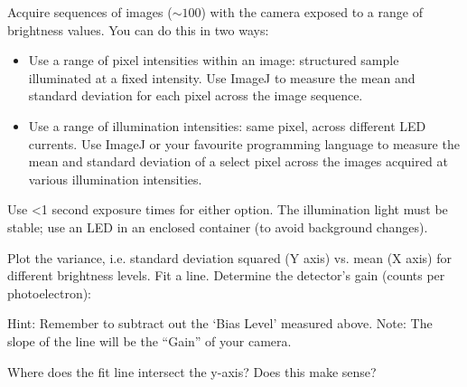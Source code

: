 \documentclass[a4paper]{report}
\newcommand{\nexercise}[0]{\arabic{exercises}\addtocounter{exercises}{1}}
\begin{document}
\begin{exercisebox}[frametitle={Exercise \nexercise: Measure shot noise}]
Acquire sequences of images ($\sim 100$) with the camera exposed to a range of brightness values. You can do this in two ways:
\begin{itemize}
	\item Use a range of pixel intensities within an image: structured sample illuminated at a fixed intensity. Use ImageJ to measure the mean and standard deviation for each pixel across the image sequence.
	\item Use a range of illumination intensities: same pixel, across different LED currents. Use ImageJ or your favourite programming language to measure the mean and standard deviation of a select pixel across the images acquired at various illumination intensities.
\end{itemize}
Use <1 second exposure times for either option. The illumination light must be stable; use an LED in an enclosed container (to avoid background changes). 

Plot the variance, i.e. standard deviation squared (Y axis) vs. mean (X axis) for different brightness levels. Fit a line. 
Determine the detector’s gain (counts per photoelectron): 

Hint: Remember to subtract out the ‘Bias Level’ measured above.
Note: The slope of the line will be the “Gain” of your camera.

Where does the fit line intersect the y-axis? Does this make sense? 
\end{exercisebox}
\end{document}
